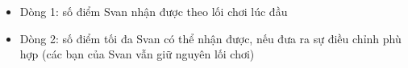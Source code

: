 \begin{itemize}
	\item Dòng 1: số điểm Svan nhận được theo lối chơi lúc đầu
	\item Dòng 2: số điểm tối đa Svan có thể nhận được, nếu đưa ra sự điều chỉnh phù hợp (các bạn của Svan vẫn giữ nguyên lối chơi)
\end{itemize}

\